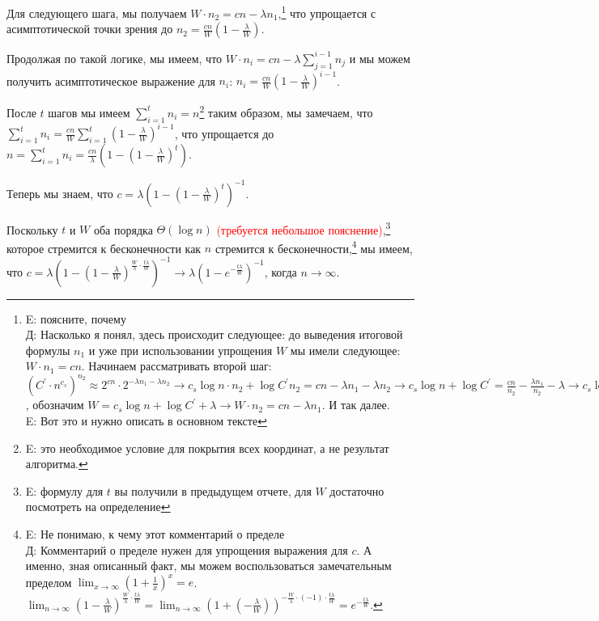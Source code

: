 \documentclass[a4paper,11pt]{article}
\begin{document}
Для следующего шага, мы получаем $W \cdot n_2 = cn - \lambda n_1$,\footnote{E: поясните, почему \\ Д: Насколько я понял, здесь происходит следующее: до выведения итоговой формулы $n_1$ и уже при использовании упрощения $W$ мы имели следующее: $W \cdot n_1 = cn$. Начинаем рассматривать второй шаг: $(C^{'} \cdot n^{c_s})^{n_2} \approx 2^{cn} \cdot 2^{-\lambda n_1 - \lambda n_2} \rightarrow c_s \log{n} \cdot n_2 + \log{C^{'}} n_2 = cn - \lambda n_1 - \lambda n_2 \rightarrow c_s \log{n} + \log{C^{'}} = \frac{cn}{n_2} - \frac{\lambda n_1}{n_2} - \lambda \rightarrow c_s \log{n} + \log{C^{'}} + \lambda = \frac{cn - \lambda n_1}{n_2}$, обозначим $W = c_s \log{n} + \log{C^{'}} + \lambda \rightarrow W \cdot n_2 = cn - \lambda n_1$. И так далее. \\

E: Вот это и нужно описать в основном тексте
} что упрощается с асимптотической точки зрения до $n_2 = \frac{cn}{W} (1 - \frac{\lambda}{W})$.

Продолжая по такой логике, мы имеем, что $W \cdot n_i = cn - \lambda \sum_{j=1}^{i-1}  n_j$ и мы можем получить асимптотическое выражение для $n_i$: $n_i = \frac{cn}{W} (1 - \frac{\lambda}{W})^{i-1}$.

После $t$ шагов мы имеем $\sum_{i=1}^t n_i = n$\footnote{E: это необходимое условие для покрытия всех координат, а не результат алгоритма.} таким образом, мы замечаем, что $\sum_{i=1}^t n_i = \frac{cn}{W} \sum_{i=1}^t (1 - \frac{\lambda}{W})^{i-1}$, что упрощается до $n = \sum_{i=1}^t n_i = \frac{cn}{\lambda} (1-(1-\frac{\lambda}{W})^t)$.

Теперь мы знаем, что $c=\lambda (1-(1-\frac{\lambda}{W})^t)^{-1}$.

Поскольку $t$ и $W$ оба порядка $\Theta(\log{n})$  \textcolor{red}{(требуется небольшое пояснение)},\footnote{E: формулу для $t$ вы получили в предыдущем отчете, для $W$ достаточно посмотреть на определение } которое стремится к бесконечности как $n$ стремится к бесконечности,\footnote{E: Не понимаю, к чему этот комментарий о пределе \\ Д: Комментарий о пределе нужен для упрощения выражения для $c$. А именно, зная описанный факт, мы можем воспользоваться замечательным пределом $\lim_{x\to \infty} (1 + \frac{1}{x})^x = e$. $\lim_{n\to \infty} (1 - \frac{\lambda}{W})^{\frac{W}{\lambda} \cdot \frac{t\lambda}{W}} = \lim_{n\to \infty}  (1 + (- \frac{\lambda}{W}))^{- \frac{W}{\lambda} \cdot (-1) \cdot \frac{t\lambda}{W}} = e^{-\frac{t\lambda}{W}}$.} мы имеем, что $c=\lambda (1-(1-\frac{\lambda}{W})^{\frac{W}{\lambda} \cdot \frac{t \lambda}{W}})^{-1} \rightarrow \lambda (1-e^{- \frac{t \lambda}{W}})^{-1}$, когда $n \rightarrow \infty$.
\end{document}
